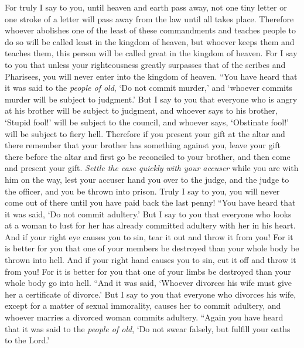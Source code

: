 \begin{biblechapter}
\verse For truly I say to you, until heaven and earth pass away, not one tiny letter or one stroke of a letter will pass away from the law until all takes place.
\verse Therefore whoever abolishes one of the least of these commandments and teaches people to do so will be called least in the kingdom of heaven, but whoever keeps them and teaches them, this person will be called great in the kingdom of heaven.
\verse For I say to you that unless your righteousness greatly surpasses that of the scribes and Pharisees, you will never enter into the kingdom of heaven.
 “You have heard that it was said to the \textit{people of old}, ‘Do not commit murder,’ and ‘whoever commits murder will be subject to judgment.’
\verse But I say to you that everyone who is angry at his brother will be subject to judgment, and whoever says to his brother, ‘Stupid fool!’ will be subject to the council, and whoever says, ‘Obstinate fool!’ will be subject to fiery hell.
\verse Therefore if you present your gift at the altar and there remember that your brother has something against you,
\verse leave your gift there before the altar and first go be reconciled to your brother, and then come and present your gift.
\verse \textit{Settle the case quickly with your accuser} while you are with him on the way, lest your accuser hand you over to the judge, and the judge to the officer, and you be thrown into prison.
\verse Truly I say to you, you will never come out of there until you have paid back the last penny!
 “You have heard that it was said, ‘Do not commit adultery.’
\verse But I say to you that everyone who looks at a woman to lust for her has already committed adultery with her in his heart.
\verse And if your right eye causes you to sin, tear it out and throw it from you! For it is better for you that one of your members be destroyed than your whole body be thrown into hell.
\verse And if your right hand causes you to sin, cut it off and throw it from you! For it is better for you that one of your limbs be destroyed than your whole body go into hell.
 “And it was said, ‘Whoever divorces his wife must give her a certificate of divorce.’
\verse But I say to you that everyone who divorces his wife, except for a matter of sexual immorality, causes her to commit adultery, and whoever marries a divorced woman commits adultery.
 “Again you have heard that it was said to the \textit{people of old}, ‘Do not swear falsely, but fulfill your oaths to the Lord.’

\end{biblechapter}
